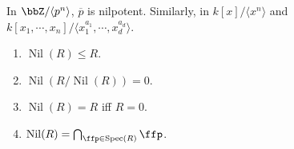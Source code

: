\begin{example}
    In $\bbZ/\langle p^n \rangle$, $\overline p$ is nilpotent. Similarly, in $k[x]/\langle x^n \rangle$ and $k[x_1,\cdots,x_n]/\langle x_1^{a_1},\cdots,x_d^{a_d}\rangle$.
\end{example}

\begin{proposition}
    \begin{enumerate}[(1)]
        \item $\operatorname{Nil}(R) \leq R$.
        \item $\operatorname{Nil}(R/\operatorname{Nil}(R)) = 0$.
        \item $\operatorname{Nil}(R) = R$ iff $R = 0$.
        \item $\operatorname{Nil}(R) = \bigcap_{\ffp \in \operatorname{Spec}(R)}\ffp$.
    \end{enumerate}
\end{proposition}

